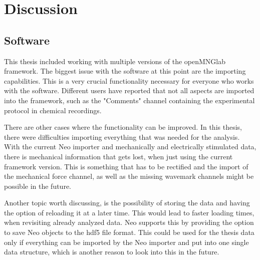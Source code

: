 \chapter{Discussion}
\begin{comment}
-speak about the problems with the software
- what needs to be fixed


-analysis:
-threshold, already mentioned in Robertos paper
-active nerve fiber has decreased response
-not linear

hdf5 not yet feasible, since we get 3 separate data structures and not one single concise format.


In this chapter I will discuss the results presented in the previous chapter and think about possible future work regarding the analysis. Also I will discuss the integration of my code (quantifiers mainly) into openMNGlab and thoughts about the structuring of the software.
\end{comment}
\section{Software}
This thesis included working with multiple versions of the openMNGlab framework. The biggest issue with the software at this point are the importing capabilities. This is a very crucial functionality necessary for everyone who works with the software. Different users have reported that not all aspects are imported into the framework, such as the "Comments" channel containing the experimental protocol in chemical recordings. 

There are other cases where the functionality can be improved. In this thesis, there were difficulties importing everything that was needed for the analysis. With the current Neo importer and mechanically and electrically stimulated data, there is mechanical information that gets lost, when just using the current framework version. This is something that has to be rectified and the import of the mechanical force channel, as well as the missing wavemark channels might be possible in the future. 

Another topic worth discussing, is the possibility of storing the data and having the option of reloading it at a later time. This would lead to faster loading times, when revisiting already analyzed data. Neo supports this by providing the option to save Neo objects to the hdf5 file format. This could be used for the thesis data only if everything can be imported by the Neo importer and put into one single data structure, which is another reason to look into this in the future. 

